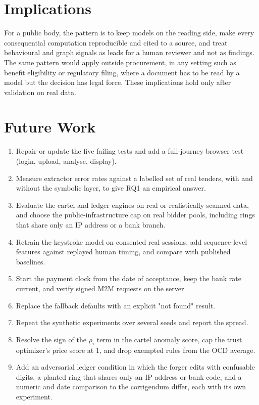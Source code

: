 \section{Implications}
For a public body, the pattern is to keep models on the reading side, make every consequential computation reproducible and cited to a source, and treat behavioural and graph signals as leads for a human reviewer and not as findings. The same pattern would apply outside procurement, in any setting such as benefit eligibility or regulatory filing, where a document has to be read by a model but the decision has legal force. These implications hold only after validation on real data.

\section{Future Work}
\begin{enumerate}
    \item Repair or update the five failing tests and add a full-journey browser test (login, upload, analyse, display).
    \item Measure extractor error rates against a labelled set of real tenders, with and without the symbolic layer, to give RQ1 an empirical answer.
    \item Evaluate the cartel and ledger engines on real or realistically scanned data, and choose the public-infrastructure cap on real bidder pools, including rings that share only an IP address or a bank branch.
    \item Retrain the keystroke model on consented real sessions, add sequence-level features against replayed human timing, and compare with published baselines.
    \item Start the payment clock from the date of acceptance, keep the bank rate current, and verify signed M2M requests on the server.
    \item Replace the fallback defaults with an explicit "not found" result.
    \item Repeat the synthetic experiments over several seeds and report the spread.
    \item Resolve the sign of the $\rho_i$ term in the cartel anomaly score, cap the trust optimizer's price score at 1, and drop exempted rules from the OCD average.
    \item Add an adversarial ledger condition in which the forger edits with confusable digits, a planted ring that shares only an IP address or bank code, and a numeric and date comparison to the corrigendum differ, each with its own experiment.
\end{enumerate}
